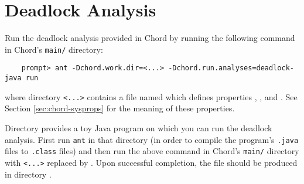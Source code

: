 \section{Deadlock Analysis}
\label{sec:deadlock}

Run the deadlock analysis provided in Chord by running the following command in Chord's {\tt main/} directory:

\begin{verbatim}
    prompt> ant -Dchord.work.dir=<...> -Dchord.run.analyses=deadlock-java run
\end{verbatim}

\noindent where directory {\tt <...>} contains a file named  which
defines properties , , and .
See Section \ref{sec:chord-sysprops} for the meaning of these properties.

Directory  provides a toy Java program on which you can run
the deadlock analysis.
First run {\tt ant} in that directory (in order to compile the program's {\tt .java} files to
{\tt .class} files) and then run the above command in Chord's {\tt main/} directory with
{\tt <...>} replaced by .
Upon successful completion, the file  should be produced in directory
.


